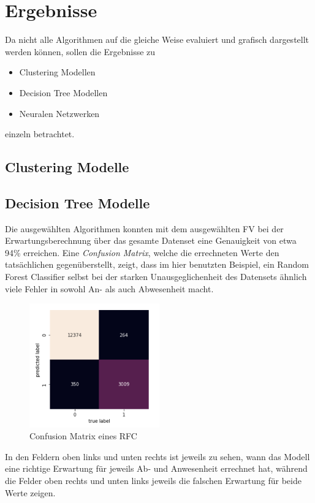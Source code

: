\newpage
\section{Ergebnisse}
Da nicht alle Algorithmen auf die gleiche Weise evaluiert und grafisch dargestellt werden können, sollen 
die Ergebnisse zu 
\begin{itemize}
    \item Clustering Modellen
    \item Decision Tree Modellen
    \item Neuralen Netzwerken
\end{itemize}
einzeln betrachtet.

\subsection{Clustering Modelle}

\subsection{Decision Tree Modelle}
Die ausgewählten Algorithmen konnten mit dem ausgewählten FV bei der Erwartungsberechnung über das gesamte 
Datenset eine Genauigkeit von etwa 94\% erreichen. Eine \textit{Confusion Matrix}, welche die errechneten 
Werte den tatsächlichen gegenüberstellt, zeigt, dass im hier benutzten Beispiel, ein Random Forest Classifier 
selbst bei der starken Unausgeglichenheit des Datensets ähnlich viele Fehler in sowohl An- als auch Abwesenheit 
macht.

\begin{figure}[h]
    \centering
    \includegraphics[width=0.5\textwidth]{pic/confusion_matrix.png}
    \caption{Confusion Matrix eines RFC}
    \label{fig:ConMatrix}
\end{figure}

In den Feldern oben links und unten rechts ist jeweils zu sehen, wann das Modell eine richtige Erwartung 
für jeweils Ab- und Anwesenheit errechnet hat, während die Felder oben rechts und unten links jeweils die falschen
Erwartung für beide Werte zeigen.\\\\

